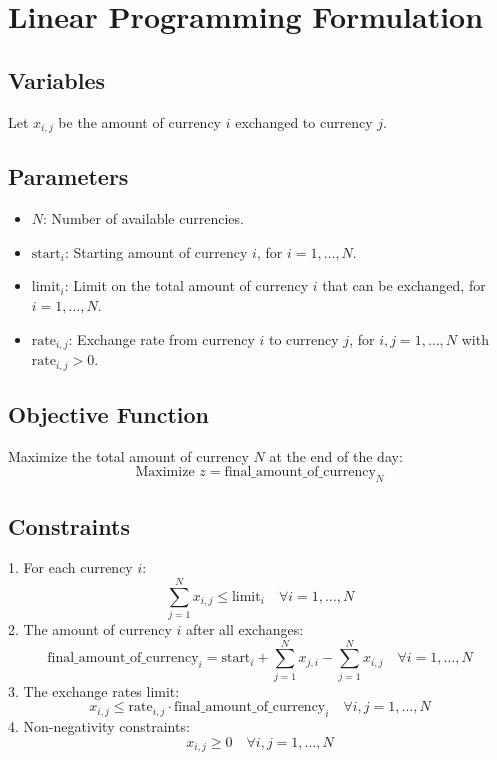 \documentclass{article}
\begin{document}
\section*{Linear Programming Formulation}

\subsection*{Variables}
Let \( x_{i,j} \) be the amount of currency \( i \) exchanged to currency \( j \).

\subsection*{Parameters}
\begin{itemize}
    \item \( N \): Number of available currencies.
    \item \( \text{start}_i \): Starting amount of currency \( i \), for \( i = 1, \ldots, N \).
    \item \( \text{limit}_i \): Limit on the total amount of currency \( i \) that can be exchanged, for \( i = 1, \ldots, N \).
    \item \( \text{rate}_{i,j} \): Exchange rate from currency \( i \) to currency \( j \), for \( i, j = 1, \ldots, N \) with \( \text{rate}_{i,j} > 0 \).
\end{itemize}

\subsection*{Objective Function}
Maximize the total amount of currency \( N \) at the end of the day:
\[
\text{Maximize } z = \text{final\_amount\_of\_currency}_N
\]

\subsection*{Constraints}
1. For each currency \( i \):
\[
\sum_{j=1}^{N} x_{i,j} \leq \text{limit}_i \quad \forall i = 1, \ldots, N
\]
2. The amount of currency \( i \) after all exchanges:
\[
\text{final\_amount\_of\_currency}_i = \text{start}_i + \sum_{j=1}^{N} x_{j,i} - \sum_{j=1}^{N} x_{i,j} \quad \forall i = 1, \ldots, N
\]
3. The exchange rates limit:
\[
x_{i,j} \leq \text{rate}_{i,j} \cdot \text{final\_amount\_of\_currency}_i \quad \forall i, j = 1, \ldots, N
\]
4. Non-negativity constraints:
\[
x_{i,j} \geq 0 \quad \forall i, j = 1, \ldots, N
\]
\end{document}
